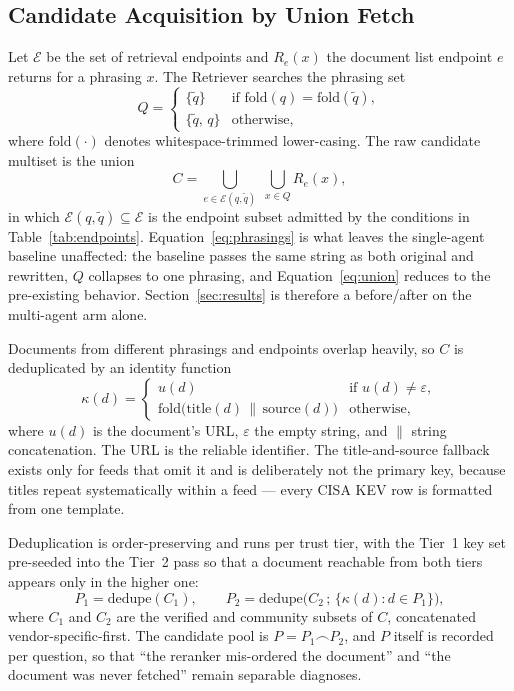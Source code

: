 \subsection{Candidate Acquisition by Union Fetch}\label{sec:union-fetch}

Let $\mathcal{E}$ be the set of retrieval endpoints and $R_e(x)$ the
document list endpoint $e$ returns for a phrasing $x$. The Retriever
searches the phrasing set
\begin{equation}
Q =
\begin{cases}
\{\tilde{q}\} & \text{if } \mathrm{fold}(q) = \mathrm{fold}(\tilde{q}),\\
\{\tilde{q},\, q\} & \text{otherwise,}
\end{cases}
\label{eq:phrasings}
\end{equation}
where $\mathrm{fold}(\cdot)$ denotes whitespace-trimmed
lower-casing. The raw candidate multiset is the union
\begin{equation}
C = \bigcup_{e \in \mathcal{E}(q,\tilde{q})} \; \bigcup_{x \in Q} R_e(x),
\label{eq:union}
\end{equation}
in which $\mathcal{E}(q,\tilde{q}) \subseteq \mathcal{E}$ is the
endpoint subset admitted by the conditions in
Table~\ref{tab:endpoints}. Equation~\eqref{eq:phrasings} is what leaves
the single-agent baseline unaffected: the baseline passes the same
string as both original and rewritten, $Q$ collapses to one phrasing,
and Equation~\eqref{eq:union} reduces to the pre-existing
behavior. Section~\ref{sec:results} is therefore a before/after on the
multi-agent arm alone.

Documents from different phrasings and endpoints overlap heavily, so
$C$ is deduplicated by an identity function
\begin{equation}
\kappa(d) =
\begin{cases}
u(d) & \text{if } u(d) \neq \varepsilon,\\
\mathrm{fold}\big(\mathrm{title}(d) \,\|\, \mathrm{source}(d)\big) & \text{otherwise,}
\end{cases}
\label{eq:key}
\end{equation}
where $u(d)$ is the document's URL, $\varepsilon$ the empty string, and
$\|$ string concatenation. The URL is the reliable identifier. The
title-and-source fallback exists only for feeds that omit it and is
deliberately not the primary key, because titles repeat systematically
within a feed --- every CISA KEV row is formatted from one template.

Deduplication is order-preserving and runs per trust tier, with the
Tier~1 key set pre-seeded into the Tier~2 pass so that a document
reachable from both tiers appears only in the higher one:
\begin{equation}
P_1 = \mathrm{dedupe}(C_1), \qquad
P_2 = \mathrm{dedupe}\big(C_2 \,;\, \{\kappa(d) : d \in P_1\}\big),
\label{eq:tiers}
\end{equation}
where $C_1$ and $C_2$ are the verified and community subsets of $C$,
concatenated vendor-specific-first. The candidate pool is
$P = P_1 \frown P_2$, and $P$ itself is recorded per question, so that
``the reranker mis-ordered the document'' and ``the document was never
fetched'' remain separable diagnoses.

